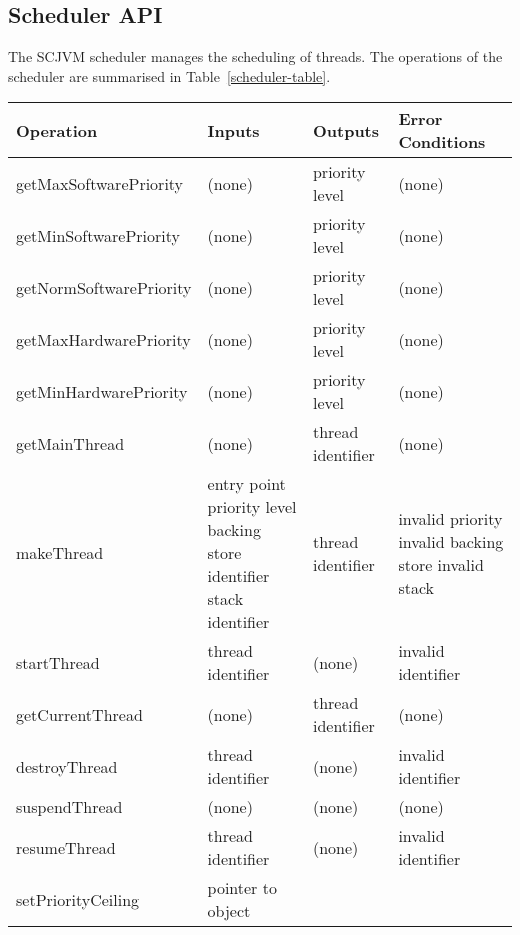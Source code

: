 \documentclass[a4paper,10pt]{article}
\begin{document}
\subsection{Scheduler API}
\label{scheduler-sec}

The SCJVM scheduler manages the scheduling of threads. The operations of the
scheduler are summarised in Table~\ref{scheduler-table}.

\begin{table}[ht]
  \centering
  \footnotesize
  \begin{tabular}{|l|p{3cm}|p{2.2cm}|p{2.7cm}|}
    Operation & Inputs & Outputs & Error Conditions \\
    \hline
    getMaxSoftwarePriority &
      (none) &
      priority level &
      (none)
    \\getMinSoftwarePriority &
      (none) &
      priority level &
      (none)
    \\getNormSoftwarePriority &
      (none) &
      priority level &
      (none)
    \\getMaxHardwarePriority &
      (none) &
      priority level &
      (none)
    \\getMinHardwarePriority &
      (none) &
      priority level &
      (none)
    \\getMainThread &
      (none) &
      thread identifier &
      (none)
    \\makeThread &
      entry point \newline
      priority level \newline
      backing store identifier \newline
      stack identifier &
      thread identifier &
      invalid priority \newline
      invalid backing store \newline
      invalid stack
    \\startThread &
      thread identifier &
      (none) &
      invalid identifier
    \\getCurrentThread &
      (none) &
      thread identifier &
      (none)
    \\destroyThread &
      thread identifier &
      (none) &
      invalid identifier
    \\suspendThread &
      (none) &
      (none) &
      (none)
    \\resumeThread &
      thread identifier &
      (none) &
      invalid identifier
    \\setPriorityCeiling &
      pointer to object \newline

\end{tabular}
\end{table}
\end{document}

